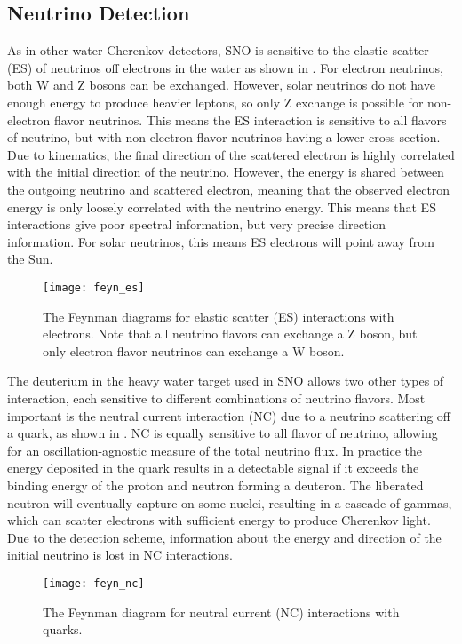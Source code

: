 \subsection{Neutrino Detection}

As in other water Cherenkov detectors, SNO is sensitive to the elastic scatter (ES) of neutrinos off electrons in the water as shown in .
For electron neutrinos, both W and Z bosons can be exchanged.
However, solar neutrinos do not have enough energy to produce heavier leptons, so only Z exchange is possible for non-electron flavor neutrinos.
This means the ES interaction is sensitive to all flavors of neutrino, but with non-electron flavor neutrinos having a lower cross section.
Due to kinematics, the final direction of the scattered electron is highly correlated with the initial direction of the neutrino.
However, the energy is shared between the outgoing neutrino and scattered electron, meaning that the observed electron energy is only loosely correlated with the neutrino energy.
This means that ES interactions give poor spectral information, but very precise direction information.
For solar neutrinos, this means ES electrons will point away from the Sun.

\begin{figure}
\centering
\texttt{[image: feyn\_es]}
\caption{\label{fig:ES}The Feynman diagrams for elastic scatter (ES) interactions with electrons. 
    Note that all neutrino flavors can exchange a Z boson, but only electron flavor neutrinos can exchange a W boson.}
\end{figure}

The deuterium in the heavy water target used in SNO allows two other types of interaction, each sensitive to different combinations of neutrino flavors.
Most important is the neutral current interaction (NC) due to a neutrino scattering off a quark, as shown in .
NC is equally sensitive to all flavor of neutrino, allowing for an oscillation-agnostic measure of the total neutrino flux.
In practice the energy deposited in the quark results in a detectable signal if it exceeds the binding energy of the proton and neutron forming a deuteron.
The liberated neutron will eventually capture on some nuclei, resulting in a cascade of gammas, which can scatter electrons with sufficient energy to produce Cherenkov light.
Due to the detection scheme, information about the energy and direction of the initial neutrino is lost in NC interactions.

\begin{figure}
\centering
    \texttt{[image: feyn\_nc]}
    \caption{\label{fig:NC}The Feynman diagram for neutral current (NC) interactions with quarks.}
\end{figure}

